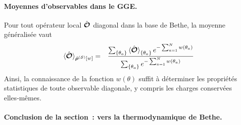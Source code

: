 \paragraph{Moyennes d'observables dans le GGE.}
Pour tout opérateur local $\hat{\bm{\mathcal{O}}}$ diagonal dans la base de Bethe,
la moyenne généralisée vaut
\begin{eqnarray}\label{chap.2.moyenne.1}
	\langle \hat{\bm{\mathcal{O}}}\rangle_{\hat{\bm{\rho}}^{(\mathcal{S})}[w]} & = & \displaystyle   \frac{\sum_{\{\theta_a \}} \braket{ \hat{\bm{\mathcal{O}}}}_{\{ \theta_a\}} e^{- \sum_{a = 1}^N w(\theta_a) }  }{\sum_{\{\theta_a  \}} e^{- \sum_{a = 1}^N  w(\theta_a) } }
\end{eqnarray}
Ainsi, la connaissance de la fonction $w(\theta)$ suffit à déterminer
les propriétés statistiques de toute observable diagonale,
y compris les charges conservées elles‑mêmes.	
	

\paragraph{Conclusion de la section : vers la thermodynamique de Bethe.}

